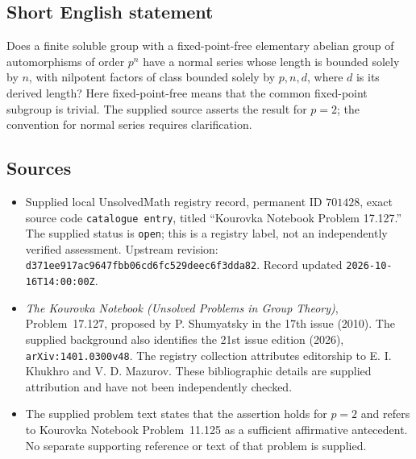 \documentclass[11pt]{article}
\begin{document}
\subsection{Short English statement}
Does a finite soluble group with a fixed-point-free elementary abelian group of automorphisms of order \(p^n\) have a normal series whose length is bounded solely by \(n\), with nilpotent factors of class bounded solely by \(p,n,d\), where \(d\) is its derived length? Here fixed-point-free means that the common fixed-point subgroup is trivial. The supplied source asserts the result for \(p=2\); the convention for normal series requires clarification.
\subsection{Sources}
\begin{itemize}
\item Supplied local UnsolvedMath registry record, permanent ID \(701428\), exact source code \texttt{catalogue entry}, titled ``Kourovka Notebook Problem 17.127.'' The supplied status is \texttt{open}; this is a registry label, not an independently verified assessment. Upstream revision: \texttt{d371ee917ac9647fbb06cd6fc529deec6f3dda82}. Record updated \texttt{2026-10-16T14:00:00Z}.
\item \emph{The Kourovka Notebook (Unsolved Problems in Group Theory)}, Problem~17.127, proposed by P. Shumyatsky in the 17th issue (2010). The supplied background also identifies the 21st issue edition (2026), \texttt{arXiv:1401.0300v48}. The registry collection attributes editorship to E. I. Khukhro and V. D. Mazurov. These bibliographic details are supplied attribution and have not been independently checked.
\item The supplied problem text states that the assertion holds for \(p=2\) and refers to Kourovka Notebook Problem~11.125 as a sufficient affirmative antecedent. No separate supporting reference or text of that problem is supplied.
\end{itemize}
\end{document}
